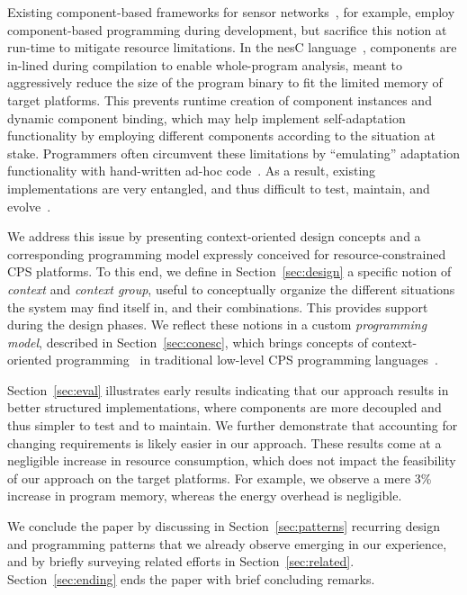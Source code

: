 Existing component-based frameworks for sensor
networks~\cite{mottola10:survey}, for example, employ component-based
programming during development, but sacrifice this notion at run-time
to mitigate resource limitations. In the nesC
language~\cite{gay03nesc}, components are in-lined during compilation
to enable whole-program analysis, meant to aggressively reduce the
size of the program binary to fit the limited memory of target
platforms. This prevents runtime creation of component instances and
dynamic component binding, which may help implement self-adaptation
functionality by employing different components according to the
situation at stake. Programmers often circumvent these limitations by
``emulating'' adaptation functionality with hand-written ad-hoc
code~\cite{mottola10:survey}. As a result, existing implementations
are very entangled, and thus difficult to test, maintain, and
evolve~\cite{Picco:2010:SEW:1882362.1882421}.

We address this issue by presenting context-oriented design concepts
and a corresponding programming model expressly conceived for
resource-constrained CPS platforms. To this end, we define in
Section~\ref{sec:design} a specific notion of \emph{context} and
\emph{context group}, useful to conceptually organize the different
situations the system may find itself in, and their combinations. This
provides support during the design phases. We reflect these notions in
a custom \emph{programming model}, described in
Section~\ref{sec:conesc}, which brings concepts of context-oriented
programming~\cite{Hirschfeld08} in traditional low-level CPS
programming languages~\cite{gay03nesc}. %

Section~\ref{sec:eval} illustrates early results indicating that our
approach results in better structured implementations, where
components are more decoupled and thus simpler to test and to
maintain. We further demonstrate that accounting for changing
requirements is likely easier in our approach. These results come at a
negligible increase in resource consumption, which does not impact the
feasibility of our approach on the target platforms. For example, we
observe a mere 3\% increase in program memory, whereas the energy
overhead is negligible. 

We conclude the paper by discussing in Section~\ref{sec:patterns}
recurring design and programming patterns that we already observe
emerging in our experience, and by briefly surveying related efforts
in Section~\ref{sec:related}. Section~\ref{sec:ending} ends the paper
with brief concluding remarks.

